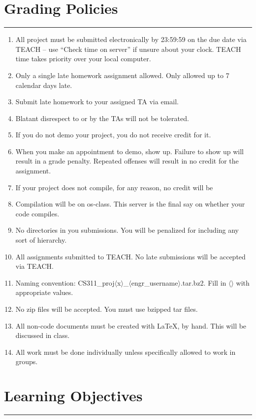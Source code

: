 \documentclass[letterpaper,10pt,fleqn]{article}
\numberwithin{equation}{section}
\begin{document}
\newpage

\section*{Grading Policies}
\hrule

\begin{enumerate}
\item All project must be submitted electronically by 23:59:59 on the due date via TEACH -- use ``Check
time on server'' if unsure about your clock. TEACH time takes priority over your local computer.
\item Only a single late homework assignment allowed. Only allowed up to 7 calendar days late.
\item Submit late homework to your assigned TA via email.
\item Blatant disrespect to or by the TAs will not be tolerated.
\item If you do not demo your project, you do not receive credit for it.
\item When you make an appointment to demo, show up. Failure to show up will result in a grade penalty.
Repeated offenses will result in no credit for the assignment.
\item If your project does not compile, for any reason, no credit will be
\item Compilation will be on os-class. This server is the final say on whether your code compiles.
\item No directories in you submissions. You will be penalized for including any sort of hierarchy.
\item All assignments submitted to TEACH. No late submissions will be accepted via TEACH.
\item Naming convention: CS311\_proj\(\langle\)x\(\rangle\)\_\(\langle\)engr\_username\(\rangle\).tar.bz2. Fill in \(\langle\)\(\rangle\) with appropriate values.
\item No zip files will be accepted. You must use bzipped tar files.
\item All non-code documents must be created with LaTeX, by hand. This will be discussed in class.
\item All work must be done individually unless specifically allowed to work in groups.
\end{enumerate}

\section*{Learning Objectives}
\hrule
\end{document}
